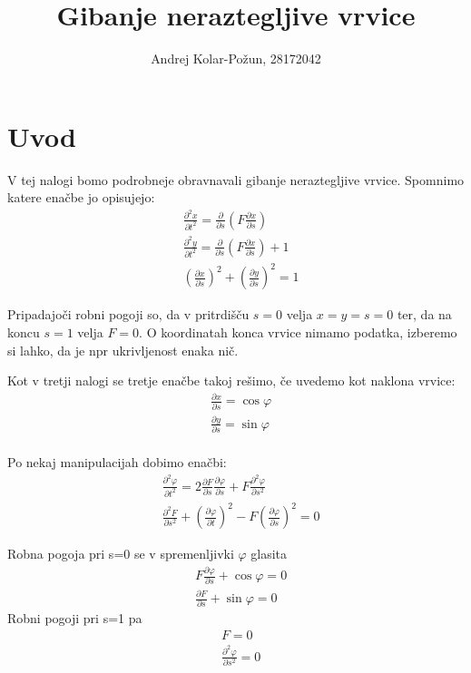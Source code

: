 \documentclass{article}
\title{Gibanje neraztegljive vrvice}
\author{Andrej Kolar-Požun, 28172042}
\begin{document}
\maketitle
{}
\section{Uvod}
V tej nalogi bomo podrobneje obravnavali gibanje neraztegljive vrvice.
Spomnimo katere enačbe jo opisujejo:
\begin{align*}
&\frac{\partial ^2 x}{\partial t^2} = \frac{\partial}{\partial s} \left( F \frac{\partial x}{\partial s} \right) \\
&\frac{\partial ^2 y}{\partial t^2} = \frac{\partial}{\partial s} \left( F \frac{\partial x}{\partial s} \right) + 1 \\
&\left( \frac{\partial x}{\partial s} \right) ^2 + \left( \frac{\partial y}{\partial s} \right) ^2 = 1
\end{align*}

Pripadajoči robni pogoji so, da v pritrdišču $s=0$ velja $x=y=s=0$ ter, da na koncu $s=1$ velja $F=0$. O koordinatah konca vrvice nimamo podatka, izberemo si lahko, da je npr ukrivljenost enaka nič.

Kot v tretji nalogi se tretje enačbe takoj rešimo, če uvedemo kot naklona vrvice:
\begin{align*}
& \frac{\partial x}{\partial s} = \cos \varphi \\
& \frac{\partial y}{\partial s} = \sin \varphi \\
\end{align*}

Po nekaj manipulacijah dobimo enačbi:
\begin{align*}
&\frac{\partial^2 \varphi}{\partial t^2} = 2 \frac{\partial F}{\partial s} \frac{\partial \varphi}{\partial s} + F \frac{\partial^2 \varphi}{\partial s^2} \\
& \frac{\partial^2 F}{\partial s^2} + \left( \frac{ \partial \varphi}{\partial t} \right) ^2 - F \left( \frac{\partial \varphi}{\partial s}\right) ^2 = 0
\end{align*}

Robna pogoja pri s=0 se v spremenljivki $\varphi$ glasita
\begin{align*}
&F \frac{\partial \varphi}{\partial s} + \cos \varphi = 0 \\
& \frac{\partial F}{\partial s} + \sin \varphi = 0
\end{align*}
Robni pogoji pri s=1 pa
\begin{align*}
&F=0 \\
&\frac{\partial^2 \varphi}{\partial s^2} = 0
\end{align*}
\end{document}
